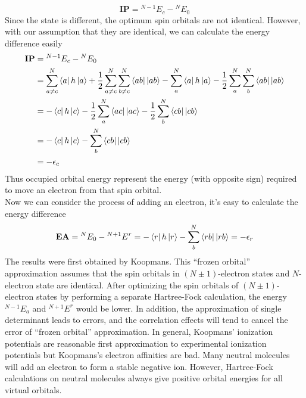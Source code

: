 \documentclass[11pt]{article}
\begin{document}
\begin{equation}
    \mathbf{IP}={}^{N-1}E_c-{}^N E_0
\end{equation}
Since the state is different, the optimum spin orbitals are not identical. However, with our assumption that
they are identical, we can calculate the energy difference easily
\begin{equation}
    \begin{split}
        \mathbf{IP}&={}^{N-1}E_c-{}^N E_0\\
        &=\sum_{a\neq c}^{N}\bra{a}h\ket{a}+\frac{1}{2}\sum_{a\neq c}^{N}\sum_{b\neq c}^{N}\bra{ab}\ket{ab}-\sum_{a}^{N}\bra{a}h\ket{a}-\frac{1}{2}\sum_{a}^{N}\sum_{b}^{N}\bra{ab}\ket{ab}\\
        &=-\bra{c}h\ket{c}-\frac{1}{2}\sum_{a}^{N}\bra{ac}\ket{ac}-\frac{1}{2}\sum_{b}^{N}\bra{cb}\ket{cb}\\
        &=-\bra{c}h\ket{c}-\sum_{b}^{N}\bra{cb}\ket{cb}\\
        &=-\epsilon_c
    \end{split}
\end{equation}
Thus occupied orbital energy represent the energy (with opposite sign) required to move an electron from that spin orbital.\\
Now we can consider the process of adding an electron, it's easy to calculate the energy difference
\begin{equation}
    \mathbf{EA}={}^{N}E_0-{}^{N+1} E^r=-\bra{r}h\ket{r}-\sum_{b}^{N}\bra{rb}\ket{rb}=-\epsilon_r
\end{equation} 
The results were first obtained by Koopmans. This ``frozen orbital'' approximation assumes that the spin orbitals in $(N\pm 1)$-electron
states and $N$-electron state are identical. After optimizing the spin orbitals of $(N\pm 1)$-electron states by performing a separate
Hartree-Fock calculation, the energy ${}^{N-1}E_a$ and ${}^{N+1}E^r$ would be lower. In addition, the approximation of single determinant
leads to errors, and the correlation effects will tend to cancel the error of ``frozen orbital'' approximation. In general, Koopmans' ionization
potentials are reasonable first approximation to experimental ionization potentials but Koopmans's electron affinities are bad. Many neutral
molecules will add an electron to form a stable negative ion. However, Hartree-Fock calculations on neutral molecules always give positive
orbital energies for all virtual orbitals.
\end{document}
